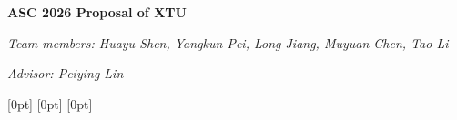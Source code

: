 \documentclass[reqno,oneside,12pt]{amsart}
\numberwithin{equation}{section}
\begin{document}
\begin{center}
\textbf{ASC 2026 Proposal of XTU}\\  %
\end{center}

\begin{flushleft}
  \textsl{Team members: Huayu Shen, Yangkun Pei, Long Jiang, Muyuan Chen, Tao Li}

  \textsl{Advisor: Peiying Lin}
\end{flushleft}


[0pt]{\vspace{0.25em}\bfseries}{\contentslabel{0.1em}}{\hspace*{0.5em}}{\contentspage}
[0pt]{\vspace{0.25em}}{\contentslabel{0.1em}}{\hspace*{1.5em}}{\contentspage}
[0pt]{\vspace{0.25em}}{\contentslabel{0.1em}}{\hspace*{2.5em}}{\contentspage}
\setcounter{tocdepth}{3}

\tableofcontents
\clearpage



\newpage
\newpage
\newpage

\newpage

\newpage

\newpage

\newpage





\clearpage



\end{document}
